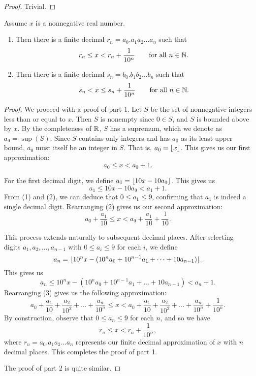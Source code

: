 \begin{proof}
  Trivial.
\end{proof}

\begin{proposition}
  Assume $x$ is a nonnegative real number.
  \begin{enumerate}
    \item Then there is a finite decimal $r_n = a_0. a_1 a_2 \ldots
      a_n$ such that
      \[ r_n \leq x < r_n + \frac{1}{10^n} \qquad \text{for all $n \in \mathbb N$}. \]
    \item Then there is a finite decimal $s_n = b_0. b_1 b_2 \ldots
      b_n$ such that
      \[ s_n < x \leq s_n + \frac{1}{10^n} \qquad \text{for all $n \in \mathbb N$}. \]
  \end{enumerate}
\end{proposition}

\begin{proof}
  We proceed with a proof of part 1. Let $S$ be the set of
  nonnegative integers less than or equal to $x$. Then $S$ is
  nonempty since $0 \in S$, and $S$ is bounded above by $x$. By the
  completeness of $\mathbb R$, $S$ has a supremum, which we denote as $a_0
  = \sup(S)$. Since $S$ contains only integers and has $a_0$ as its
  least upper bound, $a_0$ must itself be an integer in $S$. That is,
  $a_0 = \lfloor x \rfloor$. This gives us our first approximation:
  \[ a_0 \leq x < a_0 + 1. \tag{1} \]

  For the first decimal digit, we define $a_1 = \lfloor 10x - 10a_0 \rfloor$.
  This gives us
  \[ a_1 \leq 10x - 10a_0 < a_1 + 1. \tag{2} \]
  From (1) and (2), we can deduce that $0 \leq a_1 \leq 9$, confirming
  that $a_1$ is indeed a single decimal digit. Rearranging (2)
  gives us our second approximation:
  \[ a_0 + \frac{a_1}{10} \leq x < a_0 + \frac{a_1}{10} + \frac{1}{10}. \]

  This process extends naturally to subsequent decimal places.
  After selecting digits $a_1, a_2, \dots, a_{n - 1}$ with $0 \leq a_i
  \leq 9$ for each $i$, we define
  \[ a_n = \lfloor 10^n x - (10^n a_0 + 10^{n - 1} a_1 + \dots + 10
  a_{n - 1}) \rfloor. \]
  This gives us
  \[ a_n \leq 10^n x - (10^n a_0 + 10^{n - 1} a_1 + \dots + 10 a_{n -
  1}) < a_n + 1. \tag{3} \]
  Rearranging (3) gives us the following approximation:
  \[ a_0 + \frac{a_1}{10} + \frac{a_2}{10^2} + \dots +
    \frac{a_n}{10^n} \leq x < a_0 + \frac{a_1}{10} + \frac{a_2}{10^2} +
  \dots + \frac{a_n}{10^n} + \frac{1}{10^n}. \]
  By construction, observe that $0 \leq a_n \leq 9$ for each $n$, and so we have
  \[ r_n \leq x < r_n + \frac{1}{10^n}, \]
  where $r_n = a_0. a_1 a_2 \ldots a_n$ represents our finite decimal
  approximation of $x$ with $n$ decimal places. This completes the
  proof of part 1.

  The proof of part 2 is quite similar.
\end{proof}

